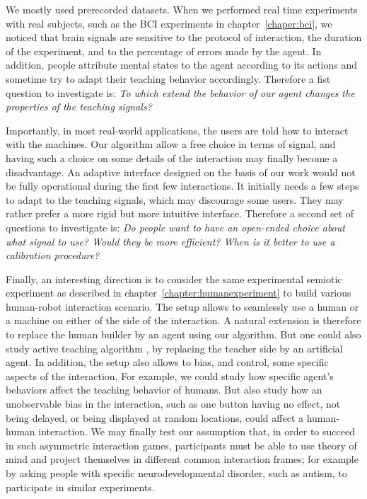 We mostly used prerecorded datasets. When we performed real time experiments with real subjects, such as the BCI experiments in chapter~\ref{chaper:bci}, we noticed that brain signals are sensitive to the protocol of interaction, the duration of the experiment, and to the percentage of errors made by the agent. In addition, people attribute mental states to the agent according to its actions and sometime try to adapt their teaching behavior accordingly. Therefore a fist question to investigate is: \emph{To which extend the behavior of our agent changes the properties of the teaching signals?}


Importantly, in most real-world applications, the users are told how to interact with the machines. Our algorithm allow a free choice in terms of signal, and having such a choice on some details of the interaction may finally become a disadvantage. An adaptive interface designed on the basis of our work would not be fully operational during the first few interactions. It initially needs a few steps to adapt to the teaching signals, which may discourage some users. They may rather prefer a more rigid but more intuitive interface. Therefore a second set of questions to investigate is: \emph{Do people want to have an open-ended choice about what signal to use? Would they be more efficient? When is it better to use a calibration procedure?}

Finally, an interesting direction is to consider the same experimental semiotic experiment as described in chapter~\ref{chapter:humanexperiment} to build various human-robot interaction scenario. The setup allows to seamlessly use a human or a machine on either of the side of the interaction. A natural extension is therefore to replace the human builder by an agent using our algorithm. But one could also study active teaching algorithm \cite{cakmak2012algorithmic}, by replacing the teacher side by an artificial agent. In addition, the setup also allows to bias, and control, some specific aspects of the interaction. For example, we could study how specific agent's behaviors affect the teaching behavior of humans. But also study how an unobservable bias in the  interaction, such as one button having no effect, not being delayed, or being displayed at random locations, could affect a human-human interaction. We may finally test our assumption that, in order to succeed in such asymmetric interaction games, participants must be able to use theory of mind and project themselves in different common interaction frames; for example by asking people with specific neurodevelopmental disorder, such as autism, to participate in similar experiments.

